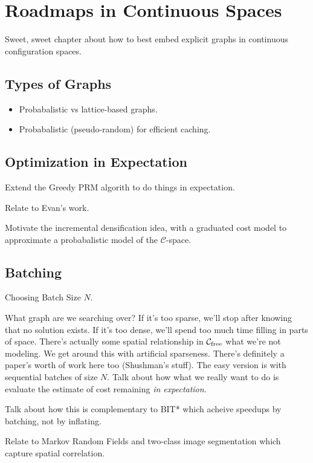 \chapter{Roadmaps in Continuous Spaces}
\label{chap:graphs-in-continuous}

Sweet, sweet chapter about how to best embed explicit graphs
in continuous configuration spaces.

\section{Types of Graphs}

\begin{itemize}
\item Probabalistic vs lattice-based graphs.
\item Probabalistic (pseudo-random) for efficient caching.
\end{itemize}

\section{Optimization in Expectation}

Extend the Greedy PRM algorith to do things in expectation.

Relate to Evan's work.

Motivate the incremental densification idea,
with a graduated cost model
to approximate a probabalistic model
of the $\mathcal{C}$-space.

\section{Batching}

Choosing Batch Size $N$.

What graph are we searching over?
If it's too sparse, we'll stop after knowing that no solution exists.
If it's too dense, we'll spend too much time filling in parts of
space.
There's actually some spatial relationship in
$\mathcal{C}_{\mbox{\scriptsize free}}$ what we're not
modeling.
We get around this with artificial sparseness.
There's definitely a paper's worth of work here too (Shushman's stuff).
The easy version is with sequential batches of size $N$.
Talk about how what we really want to do
is evaluate the estimate of cost remaining
\emph{in expectation}.

Talk about how this is complementary to BIT* which acheive speedups
by batching, not by inflating.

Relate to Markov Random Fields and two-class image segmentation
which capture spatial correlation.

